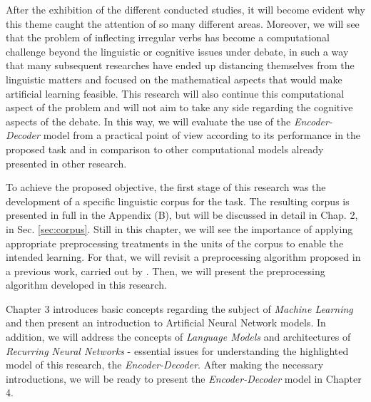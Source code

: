 
After the exhibition of the different conducted studies, it will become evident why this theme caught the attention of so many different areas. Moreover, we will see that the problem of inflecting irregular verbs has become a computational challenge beyond the linguistic or cognitive issues under debate, in such a way that many subsequent researches have ended up distancing themselves from the linguistic matters and focused on the mathematical aspects that would make artificial learning feasible. This research will also continue this computational aspect of the problem and will not aim to take any side regarding the cognitive aspects of the debate. In this way, we will evaluate the use of the \textit{Encoder-Decoder} model from a practical point of view according to its performance in the proposed task and in comparison to other computational models already presented in other research.

To achieve the proposed objective, the first stage of this research was the development of a specific linguistic corpus for the task. The resulting corpus is presented in full in the Appendix (B), but will be discussed in detail in Chap. 2, in Sec. \ref{sec:corpus}. Still in this chapter, we will see the importance of applying appropriate preprocessing treatments in the units of the corpus to enable the intended learning. For that, we will revisit a preprocessing algorithm proposed in a previous work, carried out by \cite{rumelhart:1986}. Then, we will present the preprocessing algorithm developed in this research.

Chapter 3 introduces basic concepts regarding the subject of \textit{Machine Learning} and then present an introduction to Artificial Neural Network models. In addition, we will address the concepts of \textit{Language Models} and architectures of \textit{Recurring Neural Networks} - essential issues for understanding the highlighted model of this research, the \textit{Encoder-Decoder}. After making the necessary introductions, we will be ready to present the \textit{Encoder-Decoder} model in Chapter 4.  

